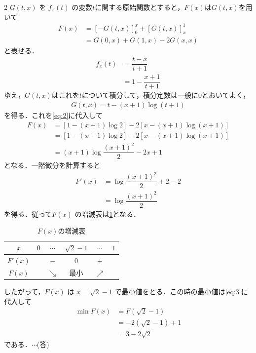 \documentclass[../../main.tex]{subfiles}
\begin{document}
\begin{multicols}{2}
  $G(t,x)$ を $f_{x}(t)$ の変数$t$に関する原始関数とすると，$F(x)$は$G(t,x)$を用いて
  \begin{align}
    F(x)
    & = [-G(t,x)]_{0}^{x} + [G(t,x)]_{x}^{1} \nonumber \\
    & = G(0,x) + G(1,x) - 2G(x,x) \label{eq:2}
  \end{align}
  と表せる．
  \begin{align}
    f_{x}(t)
    & = \dfrac{t-x}{t+1}     \\
    & = 1 - \dfrac{x+1}{t+1}
  \end{align}
  ゆえ，$G(t,x)$はこれを$t$について積分して，積分定数は一般に$0$とおいてよく，
  \begin{align}
    G(t,x) = t - (x+1)\log(t+1)
  \end{align}
  を得る．これを\cref{eq:2}に代入して
  \begin{align}
    F(x)
    & = \left[1-(x+1)\log 2\right] -2 \left[x-(x+1)\log(x+1)\right] \nonumber \\
    & = \left[1-(x+1)\log 2\right] -2 \left[x-(x+1)\log(x+1)\right] \nonumber \\
    & = (x+1) \log\dfrac{\left(x+1\right)^2}{2} -2x + 1 \label{eq:3}
  \end{align}
  となる．一階微分を計算すると
  \begin{align}
    F'(x)
    & = \log\dfrac{\left(x+1\right)^2}{2} + 2 -2 \\
    & = \log\dfrac{\left(x+1\right)^2}{2}
  \end{align}
  を得る．従って$F(x)$ の増減表は\cref{1992-1:table:1}となる．
  \begin{table}[H]
    \centering
    \caption{$F(x)$の増減表}
    \label{1992-1:table:1}
    \begin{tabular}{|c||c|c|c|c|c|}
      \hline
      $x$     & $0$ & $\cdots$   & $\sqrt{2}-1$ & $\cdots$   & $1$ \\
      \hline
      $F'(x)$ &     & $-$        & $0$          & $+$        &     \\
      \hline
      $F(x)$  &     & $\searrow$ & 最小           & $\nearrow$ &     \\
      \hline
    \end{tabular}
  \end{table}

  したがって，$F(x)$ は $x=\sqrt{2}-1$ で最小値をとる．この時の最小値は\cref{eq:3}に代入して
  \begin{align}
    \min F(x)
    & = F(\sqrt{2}-1)      \\
    & = -2(\sqrt{2}-1) + 1 \\
    & = 3 - 2\sqrt{2}
  \end{align}
  である．$\cdots$(答)


\end{multicols}
\end{document}
